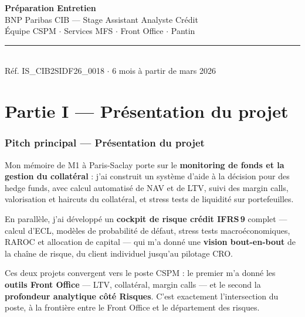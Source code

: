 \documentclass[11pt,a4paper]{article}
\begin{document}
\begin{center}
{\LARGE\bfseries\textcolor{bnpdark}{Pr\'eparation Entretien}}\\[6pt]
{\Large\textcolor{bnpgreen}{BNP Paribas CIB --- Stage Assistant Analyste Cr\'edit}}\\[4pt]
{\large\textcolor{warmgray}{\'Equipe CSPM $\cdot$ Services MFS $\cdot$ Front Office $\cdot$ Pantin}}\\[12pt]
\textcolor{warmgray}{\rule{0.5\textwidth}{0.5pt}}\\[8pt]
{\small\textcolor{warmgray}{R\'ef. IS\_CIB2SIDF26\_0018 $\cdot$ 6 mois \`a partir de mars 2026}}
\end{center}

\vspace{4pt}

\tableofcontents

\newpage

%
%

\part*{Partie I --- Pr\'esentation du projet}

\section{Pitch principal --- Pr\'esentation du projet}

\begin{pitchbox}
\og Mon m\'emoire de M1 \`a Paris-Saclay porte sur le \textbf{monitoring de fonds
et la gestion du collat\'eral} : j'ai construit un syst\`eme d'aide \`a la d\'ecision
pour des hedge funds, avec calcul automatis\'e de NAV et de LTV, suivi des margin calls,
valorisation et haircuts du collat\'eral, et stress tests de liquidit\'e sur portefeuilles.

En parall\`ele, j'ai d\'evelopp\'e un \textbf{cockpit de risque cr\'edit IFRS\,9} complet
--- calcul d'ECL, mod\`eles de probabilit\'e de d\'efaut, stress tests macro\'economiques,
RAROC et allocation de capital --- qui m'a donn\'e une \textbf{vision bout-en-bout} de la
cha\^ine de risque, du client individuel jusqu'au pilotage CRO.

Ces deux projets convergent vers le poste CSPM : le premier m'a donn\'e les
\textbf{outils Front Office} --- LTV, collat\'eral, margin calls --- et le second la
\textbf{profondeur analytique c\^ot\'e Risques}. C'est exactement l'intersection
du poste, \`a la fronti\`ere entre le Front Office et le d\'epartement des risques. \fg{}
\end{pitchbox}
\end{document}
